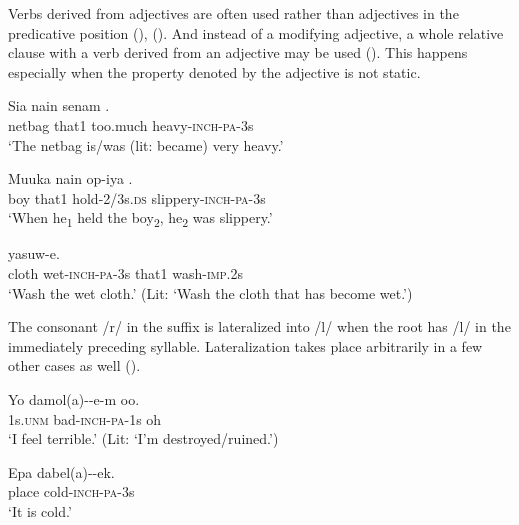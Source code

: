 Verbs derived from adjectives are often used rather than adjectives in the predicative position (), (). And instead of a modifying adjective, a whole relative clause with a verb derived from an adjective may be used (). This happens especially when the property denoted by the adjective is not static. 

\ea%
\label{ex:x82}
\gll Sia nain senam . \\
netbag that1 too.much heavy-\textsc{inch}-\textsc{pa}-3s\\
\glt`The netbag is/was (lit: became) very heavy.' 
\z

\ea%
\label{ex:x1764}
\gll Muuka nain op-iya \textstyleEmphasizedVernacularWords{-}\textstyleEmphasizedVernacularWords{-}. \\
boy that1 hold-2/3s.\textsc{ds} slippery-\textsc{inch}-\textsc{pa}-3s\\
\glt`When he\textsubscript{1} held the boy\textsubscript{2}, he\textsubscript{2} was slippery.'
\z

\ea%
\label{ex:x83}
 yasuw-e. \\
cloth wet-\textsc{inch}-\textsc{pa}-3s that1 wash-\textsc{imp}.2s\\
\glt`Wash the wet cloth.' (Lit: `Wash the cloth that has become wet.')
\z

The consonant /r/ in the suffix is lateralized into /l/ when the root has /l/ in the immediately preceding syllable. Lateralization takes place arbitrarily in a few other cases as well ().

\ea%
\label{ex:x197}
\gll Yo damol(a)--e-m oo. \\
1s.\textsc{unm} bad-\textsc{inch}-\textsc{pa}-1s oh \\
\glt`I feel terrible.' (Lit: `I'm destroyed/ruined.') 
\z

\ea%
\label{ex:x198}
\gll Epa dabel(a)--ek. \\
place cold-\textsc{inch}-\textsc{pa}-3s \\
\glt`It is cold.'
\z

